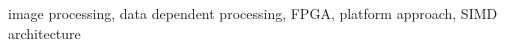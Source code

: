 \documentclass[12pt,a4paper]{IEEEtran}
\begin{document}
  \maketitle

  
\begin{keywords}
 image processing, data dependent processing, 
FPGA, platform approach, SIMD architecture
\end{keywords}

  
  
  
  
%  
 



\nocite{schoeberlleros}
\nocite{gaisler2002portable}

\nocite{hennessy1984vlsi}
\nocite{ip2006processor}
\nocite{robinson2010supersmall}
\nocite{niosII}
\nocite{picoblaze}

  
  
\end{document}
